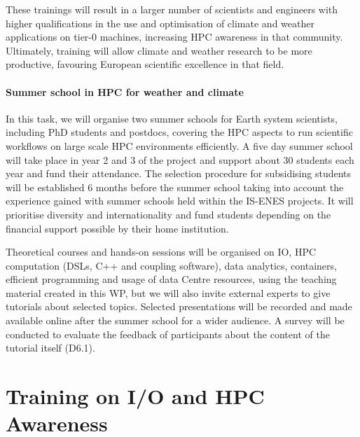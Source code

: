 These trainings will result in a larger number of scientists and engineers with higher qualifications in the use and optimisation of climate and weather applications on tier-0 machines, increasing HPC awareness in that community. Ultimately, training will allow climate and weather research to be more productive, favouring European scientific excellence in that field.

\paragraph{Summer school in HPC for weather and climate}

In this task, we will organise two summer schools for Earth system scientists, including PhD students and postdocs, covering the HPC aspects to run scientific workflows on large scale HPC environments efficiently. A five day summer school will take place in year 2 and 3 of the project and support about 30 students each year and fund their attendance. The selection procedure for subsidising students will be established 6 months before the summer school taking into account the experience gained with summer schools held within the IS-ENES projects. It will prioritise diversity and internationality and fund students depending on the financial support possible by their home institution.

Theoretical courses and hands-on sessions will be organised on IO, HPC computation (DSLs, C++ and coupling software), data analytics, containers, efficient programming and usage of data Centre resources, using the teaching material created in this WP, but we will also invite external experts to give tutorials about selected topics. Selected presentations will be recorded and made available online after the summer school for a wider audience. A survey will be conducted to evaluate the feedback of participants about the content of the tutorial itself (D6.1).

\section{Training on I/O and HPC Awareness}

